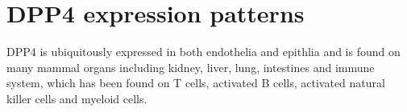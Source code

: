 \section{DPP4 expression patterns}
DPP4 is ubiquitously expressed in both endothelia and epithlia and is found on many mammal organs including kidney, liver, lung, intestines and immune system, which has been found on T cells, activated B cells, activated natural killer cells and myeloid cells.~\cite{Abbott1994,Shingu2003,Hong1989,Gutschmidt1981,Dikov2004,Bühling1995,Tanaka1992,Gorrell1991} 